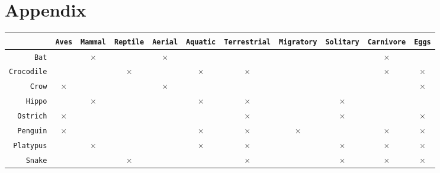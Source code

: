 \onecolumn
\section*{Appendix}
\begin{table}[h]
	\centering
	\begin{tabular}{rcccccccccc}
		                   & \texttt{Aves} & \texttt{Mammal} & \texttt{Reptile} & \texttt{Aerial} & \texttt{Aquatic} & \texttt{Terrestrial} & \texttt{Migratory} & \texttt{Solitary} & \texttt{Carnivore} & \texttt{Eggs} \\
		\hline
		\texttt{Bat}       &               & $\times$        &                  & $\times$        &                  &                      &                    &                   & $\times$           &               \\
		\texttt{Crocodile} &               &                 & $\times$         &                 & $\times$         & $\times$             &                    &                   & $\times$           & $\times$      \\
		\texttt{Crow}      & $\times$      &                 &                  & $\times$        &                  &                      &                    &                   &                    & $\times$      \\
		\texttt{Hippo}     &               & $\times$        &                  &                 & $\times$         & $\times$             &                    & $\times$          &                    &               \\
		\texttt{Ostrich}   & $\times$      &                 &                  &                 &                  & $\times$             &                    & $\times$          &                    & $\times$      \\
		\texttt{Penguin}   & $\times$      &                 &                  &                 & $\times$         & $\times$             & $\times$           &                   & $\times$           & $\times$      \\
		\texttt{Platypus}  &               & $\times$        &                  &                 & $\times$         & $\times$             &                    & $\times$          & $\times$           & $\times$      \\
		\texttt{Snake}     &               &                 & $\times$         &                 &                  & $\times$             &                    & $\times$          & $\times$           & $\times$      \\

\end{tabular}
\end{table}
